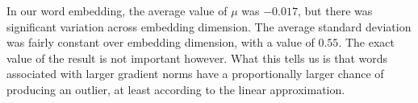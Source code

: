 In our word embedding, the average value of $\mu$ was $-0.017$, but there was significant variation across embedding dimension.  The average standard deviation was fairly constant over embedding dimension, with a value of $0.55$.  The exact value of the result is not important however.  What this tells us is that words associated with larger gradient norms have a proportionally larger chance of producing an outlier, at least according to the linear approximation.

